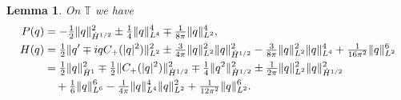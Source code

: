 \documentclass[10pt,a4paper]{amsart}
\newtheorem{lemma}{Lemma}
\newcommand{\T}{\mathbb{T}}
\begin{document}
\begin{lemma}\label{L:P and H}
On $\T$ we have 
\begin{align*}
P(q)&=-\tfrac{1}{2}\|q\|_{\dot{H}^{1/2}}^2\pm \tfrac14\|q\|_{L^4}^4\mp\tfrac1{8\pi}\|q\|_{L^2}^4,\\
H(q)&=\tfrac12\|q'\mp i qC_+(|q|^2)\|_{L^2}^2\pm \tfrac{3}{4\pi} \|q\|_{L^2}^2\|q\|_{\dot{H}^{1/2}}^2-\tfrac{3}{8\pi}\|q\|_{L^2}^2\|q\|_{L^4}^4+\tfrac{1}{16\pi^2}\|q\|_{L^2}^6\notag\\
&= \tfrac12\|q\|_{\dot{H}^{1}}^2\mp\tfrac12\| C_+(|q|^2)\|_{\dot{H}^{1/2}}^2\mp\tfrac14\|q^2\|_{\dot{H}^{1/2}}^2\pm \tfrac1{2\pi}\|q\|_{L^2}^2\|q\|_{\dot{H}^{1/2}}^2\nonumber\\
&\quad+\tfrac{1}{6}\|q\|_{L^6}^6-\tfrac1{4\pi}\|q\|_{L^4}^4\|q\|_{L^2}^2+\tfrac{1}{12\pi^2}\|q\|_{L^2}^6.
\end{align*}
\end{lemma}
\end{document}
